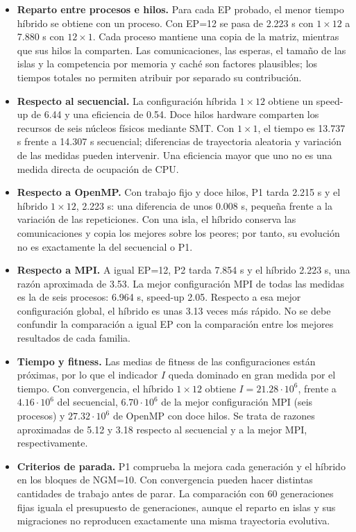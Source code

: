 \documentclass[12pt]{article}
\begin{document}
\begin{enumerate}
\begin{itemize}
    \item \textbf{Reparto entre procesos e hilos.} Para cada EP probado, el menor tiempo híbrido se obtiene con un proceso. Con EP=12 se pasa de 2.223 s con $1\times12$ a 7.880 s con $12\times1$. Cada proceso mantiene una copia de la matriz, mientras que sus hilos la comparten. Las comunicaciones, las esperas, el tamaño de las islas y la competencia por memoria y caché son factores plausibles; los tiempos totales no permiten atribuir por separado su contribución.
    \item \textbf{Respecto al secuencial.} La configuración híbrida $1\times12$ obtiene un speed-up de 6.44 y una eficiencia de 0.54. Doce hilos hardware comparten los recursos de seis núcleos físicos mediante SMT. Con $1\times1$, el tiempo es 13.737 s frente a 14.307 s secuencial; diferencias de trayectoria aleatoria y variación de las medidas pueden intervenir. Una eficiencia mayor que uno no es una medida directa de ocupación de CPU.
    \item \textbf{Respecto a OpenMP.} Con trabajo fijo y doce hilos, P1 tarda 2.215 s y el híbrido $1\times12$, 2.223 s: una diferencia de unos 0.008 s, pequeña frente a la variación de las repeticiones. Con una isla, el híbrido conserva las comunicaciones y copia los mejores sobre los peores; por tanto, su evolución no es exactamente la del secuencial o P1.
    \item \textbf{Respecto a MPI.} A igual EP=12, P2 tarda 7.854 s y el híbrido 2.223 s, una razón aproximada de 3.53. La mejor configuración MPI de todas las medidas es la de seis procesos: 6.964 s, speed-up 2.05. Respecto a esa mejor configuración global, el híbrido es unas 3.13 veces más rápido. No se debe confundir la comparación a igual EP con la comparación entre los mejores resultados de cada familia.
    \item \textbf{Tiempo y fitness.} Las medias de fitness de las configuraciones están próximas, por lo que el indicador $I$ queda dominado en gran medida por el tiempo. Con convergencia, el híbrido $1\times12$ obtiene $I=21.28\cdot10^6$, frente a $4.16\cdot10^6$ del secuencial, $6.70\cdot10^6$ de la mejor configuración MPI (seis procesos) y $27.32\cdot10^6$ de OpenMP con doce hilos. Se trata de razones aproximadas de 5.12 y 3.18 respecto al secuencial y a la mejor MPI, respectivamente.
    \item \textbf{Criterios de parada.} P1 comprueba la mejora cada generación y el híbrido en los bloques de NGM=10. Con convergencia pueden hacer distintas cantidades de trabajo antes de parar. La comparación con 60 generaciones fijas iguala el presupuesto de generaciones, aunque el reparto en islas y sus migraciones no reproducen exactamente una misma trayectoria evolutiva.
\end{itemize}


\end{enumerate}
\end{document}
